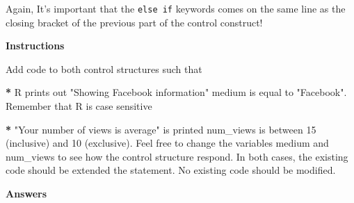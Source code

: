 \documentclass[]{article}
\newcommand{\hlnum}[1]{\textcolor[rgb]{0.816,0.125,0.439}{#1}}%
\newcommand{\hlstr}[1]{\textcolor[rgb]{0.251,0.627,0.251}{#1}}%
\newcommand{\hlstd}[1]{\textcolor[rgb]{0.251,0.251,0.251}{#1}}%
\newenvironment{Shaded}{\begin{myshaded}}{\end{myshaded}}
\newcommand{\DecValTok}[1]{\hlnum{#1}}
\newcommand{\StringTok}[1]{\hlstr{#1}}
\newcommand{\ErrorTok}[1]{\textbf{{#1}}}
\newcommand{\NormalTok}[1]{\hlstd{#1}}
\begin{document}
Again, It's important that the \texttt{else\ if} keywords comes on the
same line as the closing bracket of the previous part of the control
construct!

\textbf{Instructions}

\begin{Shaded}
\begin{Highlighting}[]

\NormalTok{Add code to both control structures such that}\OperatorTok{:}

\ErrorTok{*}\StringTok{ }\NormalTok{R prints out }\StringTok{"Showing Facebook information"} \NormalTok{ medium is equal to }\StringTok{"Facebook"}\NormalTok{. Remember that R is case sensitive}\OperatorTok{!}

\ErrorTok{*}\StringTok{ "Your number of views is average"}\NormalTok{ is printed }\NormalTok{ num_views is between }\DecValTok{15}\NormalTok{ (inclusive) and }\DecValTok{10}\NormalTok{ (exclusive). Feel free to change the variables medium and num_views to see how the control structure respond. In both cases, the existing code should be extended }\NormalTok{ the } \NormalTok{ statement. No existing code should be modified.}
\end{Highlighting}
\end{Shaded}

\textbf{Answers}
\end{document}
